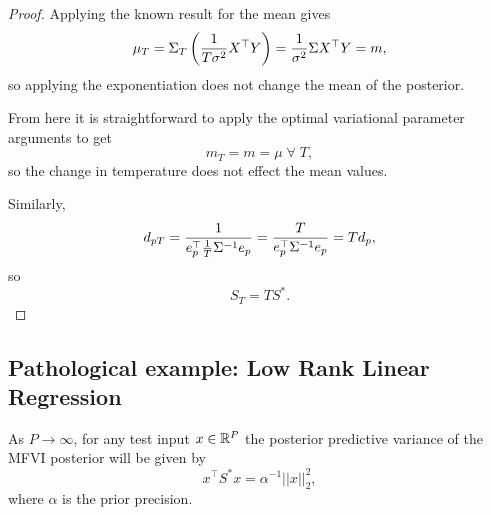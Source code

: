 \begin{proof}
    Applying the known result for the mean gives 
    \begin{equation}
        \mu_T = \Sigma_T \left(\frac{1}{T \sigma^2} X^\top Y \right)
        = \frac{1}{\sigma^2} \Sigma X^\top Y = m,
    \end{equation}
    so applying the exponentiation does not change the mean of the posterior. 

    From here it is straightforward to apply the optimal variational parameter arguments to get 
    \begin{equation}
        m_T  = m = \mu \; \forall \;  T, 
    \end{equation}
    so the change in temperature does not effect the mean values. 
    
    Similarly, 
    \begin{equation}
        d_{pT}= \frac{1}{e_p^\top  \frac{1}{T} \Sigma^{-1} e_p } = \frac{T}{e_p^\top \Sigma^{-1} e_p} = T d_p,
    \end{equation}
    so 
    \begin{equation}
        S_T = T S^*. 
    \end{equation}
\end{proof}

\subsection{Pathological example: Low Rank Linear Regression}
\label{sec:low-rank-proofs}

\begin{proposition*} 
    As $P \to \infty$, for any test input $x\in \mathbb{R}^P$ the posterior predictive variance of the MFVI posterior will be given by 
    \begin{equation}
        x^\top  S^* x = \alpha^{-1} || x ||_2^2,
    \end{equation}
    where $\alpha$ is the prior precision. 
\end{proposition*}

